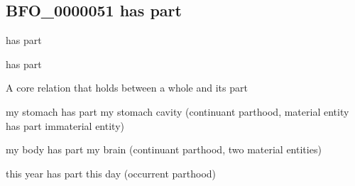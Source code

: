 \documentclass[letterpaper,10pt,english]{sphinxmanual}
\begin{document}
\subsection{BFO\_0000051 \sphinxhyphen{} has part}
\label{\detokenize{doc-BFO_0000051:bfo-0000051-has-part}}\label{\detokenize{doc-BFO_0000051:index-0}}\label{\detokenize{doc-BFO_0000051::doc}}
\begin{sphinxShadowBox}

\sphinxAtStartPar
has part
\end{sphinxShadowBox}

\begin{sphinxShadowBox}

\sphinxAtStartPar
has part
\end{sphinxShadowBox}

\begin{sphinxShadowBox}

\sphinxAtStartPar
{\hyperref[\detokenize{doc-RO_0002131::doc}]{}}
\end{sphinxShadowBox}

\begin{sphinxShadowBox}

\sphinxAtStartPar
A core relation that holds between a whole and its part
\end{sphinxShadowBox}

\begin{sphinxShadowBox}

\sphinxAtStartPar
my stomach has part my stomach cavity (continuant parthood, material entity has part immaterial entity)

\sphinxAtStartPar
my body has part my brain (continuant parthood, two material entities)

\sphinxAtStartPar
this year has part this day (occurrent parthood)
\end{sphinxShadowBox}
\end{document}
